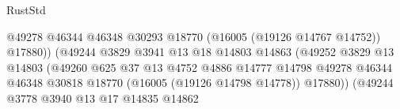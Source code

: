\begin{lexlean}{RustStd}
\begin{coremodule}
                                                          @49278
                                                          @46344
                                                          @46348
                                                          @30293
                                                          @18770
                                                          (@16005 (@19126 @14767 @14752))
                                                          @17880))
                                                      (@49244
                                                        @3829
                                                        @3941
                                                        @13
                                                        @18
                                                        @14803
                                                        @14863
                                                        (@49252
                                                          @3829
                                                          @13
                                                          @14803
                                                          (@49260
                                                            @625
                                                            @37
                                                            @13
                                                            @4752
                                                            @4886
                                                            @14777
                                                            @14798
                                                            @49278
                                                            @46344
                                                            @46348
                                                            @30818
                                                            @18770
                                                            (@16005 (@19126 @14798 @14778))
                                                            @17880))
                                                        (@49244
                                                          @3778
                                                          @3940
                                                          @13
                                                          @17
                                                          @14835
                                                          @14862

\end{coremodule}
\end{lexlean}
